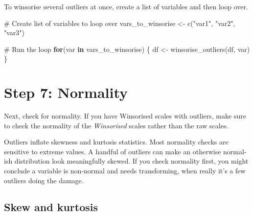 \documentclass[
  letterpaper,
  DIV=11,
  numbers=noendperiod]{scrreprt}
\newenvironment{Shaded}{\begin{snugshade}}{\end{snugshade}}
\newcommand{\CommentTok}[1]{\textcolor[rgb]{0.37,0.37,0.37}{#1}}
\newcommand{\ControlFlowTok}[1]{\textcolor[rgb]{0.00,0.23,0.31}{\textbf{#1}}}
\newcommand{\FunctionTok}[1]{\textcolor[rgb]{0.28,0.35,0.67}{#1}}
\newcommand{\NormalTok}[1]{\textcolor[rgb]{0.00,0.23,0.31}{#1}}
\newcommand{\OtherTok}[1]{\textcolor[rgb]{0.00,0.23,0.31}{#1}}
\newcommand{\StringTok}[1]{\textcolor[rgb]{0.13,0.47,0.30}{#1}}
\begin{document}
To winsorise several outliers at once, create a list of variables and
then loop over.

\begin{Shaded}
\begin{Highlighting}[]
\CommentTok{\# Create list of variables to loop over}
\NormalTok{vars\_to\_winsorise }\OtherTok{\textless{}{-}} \FunctionTok{c}\NormalTok{(}\StringTok{"var1"}\NormalTok{, }\StringTok{"var2"}\NormalTok{, }\StringTok{"var3"}\NormalTok{)}

\CommentTok{\# Run the loop}
\ControlFlowTok{for}\NormalTok{(var }\ControlFlowTok{in}\NormalTok{ vars\_to\_winsorise) \{}
\NormalTok{  df }\OtherTok{\textless{}{-}} \FunctionTok{winsorise\_outliers}\NormalTok{(df, var)}
\NormalTok{\}}
\end{Highlighting}
\end{Shaded}

\section{Step 7: Normality}\label{step-7-normality}

Next, check for normality. If you have Winsorised scales with outliers,
make sure to check the normality of the \emph{Winsorised} scales rather
than the raw scales.

\begin{tcolorbox}[enhanced jigsaw, toprule=.15mm, coltitle=black, colframe=quarto-callout-note-color-frame, colbacktitle=quarto-callout-note-color!10!white, opacityback=0, left=2mm, breakable, rightrule=.15mm, bottomrule=.15mm, leftrule=.75mm, titlerule=0mm, arc=.35mm, opacitybacktitle=0.6, toptitle=1mm, bottomtitle=1mm, title=\textcolor{quarto-callout-note-color}{\faInfo}\hspace{0.5em}{Why outliers before normality?}, colback=white]

Outliers inflate skewness and kurtosis statistics. Most normality checks
are sensitive to extreme values. A handful of outliers can make an
otherwise normal-ish distribution look meaningfully skewed. If you check
normality first, you might conclude a variable is non-normal and needs
transforming, when really it's a few outliers doing the damage.

\end{tcolorbox}

\subsection{Skew and kurtosis}\label{skew-and-kurtosis}
\end{document}
